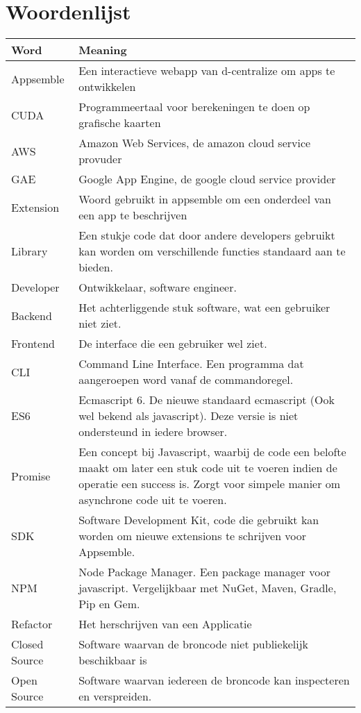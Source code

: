 \chapter{Woordenlijst}
\begin{tabular}{|p{3cm}|p{11cm}|}
	\hline
	\textbf{Word} & \textbf{Meaning} \\
	\hline
	Appsemble & Een interactieve webapp van d-centralize om apps te ontwikkelen\\ \hline
	CUDA & Programmeertaal voor berekeningen te doen op grafische kaarten \\ \hline
	AWS & Amazon Web Services, de amazon cloud service provuder \\ \hline
	GAE & Google App Engine, de google cloud service provider \\ \hline
	Extension & Woord gebruikt in appsemble om een onderdeel van een app te beschrijven \\ \hline
	Library & Een stukje code dat door andere developers gebruikt kan worden om verschillende functies standaard aan te bieden. \\ \hline
	Developer & Ontwikkelaar, software engineer. \\ \hline
	Backend & Het achterliggende stuk software, wat een gebruiker niet ziet. \\ \hline
	Frontend & De interface die een gebruiker wel ziet. \\ \hline
	CLI & Command Line Interface. Een programma dat aangeroepen word vanaf de commandoregel. \\ \hline	
	ES6 & Ecmascript 6. De nieuwe standaard ecmascript (Ook wel bekend als javascript). Deze versie is niet ondersteund in iedere browser. \\ \hline
	Promise & Een concept bij Javascript, waarbij de code een belofte maakt om later een stuk code uit te voeren indien de operatie een success is. Zorgt voor simpele manier om asynchrone code uit te voeren. \\ \hline
	SDK & Software Development Kit, code die gebruikt kan worden om nieuwe extensions te schrijven voor Appsemble. \\ \hline
	NPM & Node Package Manager. Een package manager voor javascript. Vergelijkbaar met NuGet, Maven, Gradle, Pip en Gem. \\ \hline
	Refactor & Het herschrijven van een Applicatie \\ \hline
	Closed Source & Software waarvan de broncode niet publiekelijk beschikbaar is \\ \hline
	Open Source & Software waarvan iedereen de broncode kan inspecteren en verspreiden. \\ \hline

\end{tabular}
